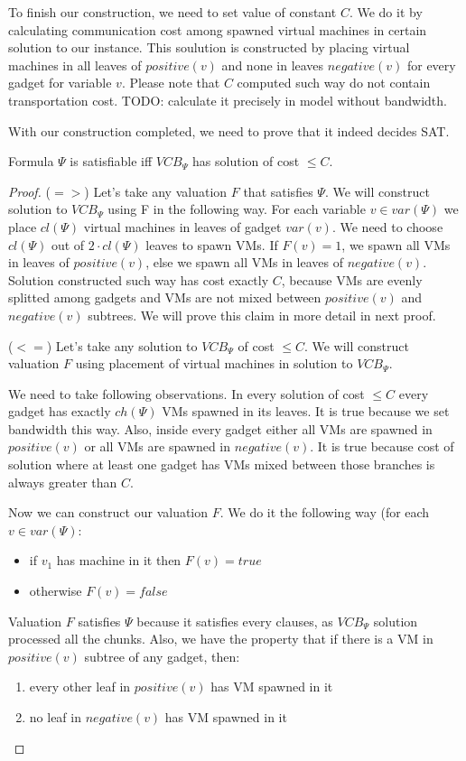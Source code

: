To finish our construction, we need to set value of constant $C$. We
do it by calculating communication cost among spawned virtual machines in
certain solution to our instance. This soulution is constructed by placing
virtual machines in all leaves of $positive(v)$ and none in leaves
$negative(v)$ for every gadget for variable $v$. Please note that $C$
computed such way do not contain transportation cost. TODO: calculate
it precisely in model without bandwidth.

With our construction completed, we need to prove that it indeed
decides SAT.

\begin{theorem}Formula $\Psi$ is satisfiable iff $VCB_{\Psi}$ has
solution of cost $\leq C$.
\end{theorem}

\begin{proof}
($=>$) Let's take any valuation $F$ that satisfies $\Psi$. We will construct
solution to $VCB_{\Psi}$ using F in the following way. For each
variable $v \in var(\Psi)$ we place $cl(\Psi)$ virtual machines in
leaves of gadget $var(v)$. We need to choose $cl(\Psi)$ out of
$2 \cdot cl(\Psi)$ leaves to spawn VMs. If $F(v) = 1$, we spawn all VMs in leaves
of $positive(v)$, else we spawn all VMs in leaves of
$negative(v)$. Solution constructed such way has cost exactly
$C$, because VMs are evenly splitted among gadgets and VMs are not
mixed between $positive(v)$ and $negative(v)$ subtrees. We will prove
this claim in more detail in next proof. 

($<=$) Let's take any solution to $VCB_{\Psi}$ of cost $\leq C$. We
will construct valuation $F$ using placement of virtual machines in
solution to $VCB_{\Psi}$.

We need to take following observations. In every solution of cost
$\leq C$ every gadget has exactly $ch(\Psi)$ VMs spawned in its
leaves. It is true because we set bandwidth this way. Also, inside every gadget either all VMs are spawned in
$positive(v)$ or all VMs are spawned in $negative(v)$. It is true
because cost of solution where at least one gadget has VMs mixed
between those branches is always greater than $C$.

Now we can construct our valuation $F$. We do it the following way
(for each $v \in var(\Psi)$:

\begin{itemize}
\item if $v_1$ has machine in it then $F(v) = true$
\item otherwise $F(v) = false$
\end{itemize}

Valuation $F$ satisfies $\Psi$ because it satisfies every clauses, as
$VCB_{\Psi}$ solution processed all the chunks. Also, we have the
property that if there is a VM in $positive(v)$ subtree of any gadget,
then:
\begin{enumerate}
\item every other leaf in $positive(v)$ has VM spawned in it
\item no leaf in $negative(v)$ has VM spawned in it
\end{enumerate}

\end{proof}

